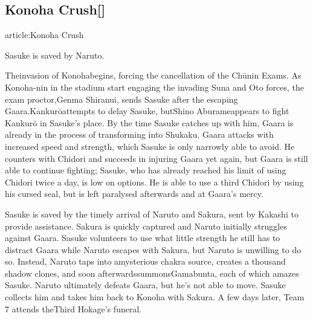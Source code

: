 \documentclass[a4paper,12pt]{article}
\begin{document}
\subsection*{Konoha Crush[]}\n\nMain article:Konoha Crush\\ \par \vspace{0.5cm}

Sasuke is saved by Naruto.\\ \par \vspace{0.5cm}

Theinvasion of Konohabegins, forcing the cancellation of the Chūnin Exams. As Konoha-nin in the stadium start engaging the invading Suna and Oto forces, the exam proctor,Genma Shiranui, sends Sasuke after the escaping Gaara.Kankurōattempts to delay Sasuke, butShino Aburameappears to fight Kankurō in Sasuke's place. By the time Sasuke catches up with him, Gaara is already in the process of transforming into Shukaku. Gaara attacks with increased speed and strength, which Sasuke is only narrowly able to avoid. He counters with Chidori and succeeds in injuring Gaara yet again, but Gaara is still able to continue fighting; Sasuke, who has already reached his limit of using Chidori twice a day, is low on options. He is able to use a third Chidori by using his cursed seal, but is left paralysed afterwards and at Gaara's mercy.\\ \par \vspace{0.5cm}

Sasuke is saved by the timely arrival of Naruto and Sakura, sent by Kakashi to provide assistance. Sakura is quickly captured and Naruto initially struggles against Gaara. Sasuke volunteers to use what little strength he still has to distract Gaara while Naruto escapes with Sakura, but Naruto is unwilling to do so. Instead, Naruto taps into amysterious chakra source, creates a thousand shadow clones, and soon afterwardssummonsGamabunta, each of which amazes Sasuke. Naruto ultimately defeats Gaara, but he's not able to move. Sasuke collects him and takes him back to Konoha with Sakura. A few days later, Team 7 attends theThird Hokage's funeral.\\ \par \vspace{0.5cm}
\end{document}
